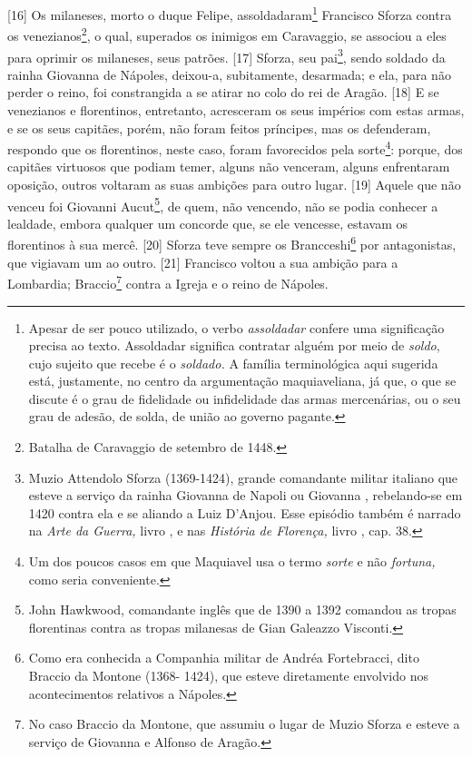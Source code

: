 {[}16{]} Os milaneses, morto o duque Felipe, assoldadaram\footnote{Apesar
  de ser pouco utilizado, o verbo \emph{assoldadar} confere uma
  significação precisa ao texto. Assoldadar significa contratar alguém
  por meio de \emph{soldo}, cujo sujeito que recebe é o \emph{soldado.}
  A família terminológica aqui sugerida está, justamente, no centro da
  argumentação maquiaveliana, já que, o que se discute é o grau de
  fidelidade ou infidelidade das armas mercenárias, ou o seu grau de
  adesão, de solda, de união ao governo pagante.} Francisco Sforza
contra os venezianos\footnote{Batalha de Caravaggio de setembro de 1448.},
o qual, superados os inimigos em Caravaggio, se associou a eles para
oprimir os milaneses, seus patrões. {[}17{]} Sforza, seu pai\footnote{Muzio
  Attendolo Sforza (1369-1424), grande comandante militar italiano que
  esteve a serviço da rainha Giovanna de Napoli ou Giovanna ,
  rebelando-se em 1420 contra ela e se aliando a Luiz  D'Anjou. Esse
  episódio também é narrado na \emph{Arte da Guerra,} livro , e nas
  \emph{História de Florença,} livro , cap. 38.}, sendo soldado da
rainha Giovanna de Nápoles, deixou-a, subitamente, desarmada; e ela,
para não perder o reino, foi constrangida a se atirar no colo do rei de
Aragão. {[}18{]} E se venezianos e florentinos, entretanto, acresceram
os seus impérios com estas armas, e se os seus capitães, porém, não
foram feitos príncipes, mas os defenderam, respondo que os florentinos,
neste caso, foram favorecidos pela sorte\footnote{Um dos poucos casos em
  que Maquiavel usa o termo \emph{sorte} e não \emph{fortuna,} como
  seria conveniente.}: porque, dos capitães virtuosos que podiam temer,
alguns não venceram, alguns enfrentaram oposição, outros voltaram as
suas ambições para outro lugar. {[}19{]} Aquele que não venceu foi
Giovanni Aucut\footnote{John Hawkwood, comandante inglês que de 1390 a
  1392 comandou as tropas florentinas contra as tropas milanesas de Gian
  Galeazzo Visconti.}, de quem, não vencendo, não se podia conhecer a
lealdade, embora qualquer um concorde que, se ele vencesse, estavam os
florentinos à sua mercê. {[}20{]} Sforza teve sempre os
Brancceshi\footnote{Como era conhecida a Companhia militar de Andréa
  Fortebracci, dito Braccio da Montone (1368- 1424), que esteve
  diretamente envolvido nos acontecimentos relativos a Nápoles.} por
antagonistas, que vigiavam um ao outro. {[}21{]} Francisco voltou a sua
ambição para a Lombardia; Braccio\footnote{No caso Braccio da Montone,
  que assumiu o lugar de Muzio Sforza e esteve a serviço de Giovanna 
  e Alfonso de Aragão.} contra a Igreja e o reino de Nápoles.


